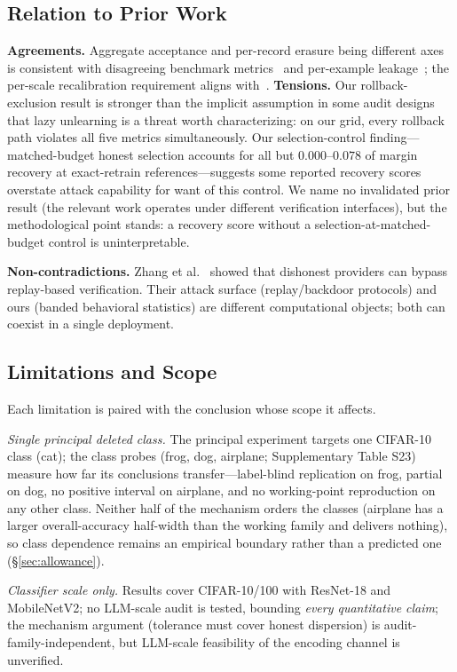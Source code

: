 \documentclass[lettersize,journal]{IEEEtran}
\begin{document}
\subsection{Relation to Prior Work}
\textbf{Agreements.} Aggregate acceptance and per-record
erasure being different axes is consistent with disagreeing
benchmark metrics~\cite{dorna2025openunlearning} and
per-example leakage~\cite{hayes2024inexact}; the per-scale
recalibration requirement aligns
with~\cite{goel2022adversarial}.
\textbf{Tensions.} Our rollback-exclusion result is stronger
than the implicit assumption in some audit designs that lazy
unlearning is a threat worth characterizing: on our grid,
every rollback path violates all five metrics simultaneously.
Our selection-control finding---matched-budget honest
selection accounts for all but $0.000$--$0.078$ of margin
recovery at exact-retrain references---suggests some reported
recovery scores overstate attack capability for want of this
control. We name no invalidated prior result (the relevant
work operates under different verification interfaces), but
the methodological point stands: a recovery score without a
selection-at-matched-budget control is uninterpretable.

\textbf{Non-contradictions.} Zhang et
al.~\cite{zhang2024fragile} showed that dishonest providers
can bypass replay-based verification. Their attack surface
(replay/backdoor protocols) and ours (banded behavioral
statistics) are different computational objects; both can
coexist in a single deployment.

\subsection{Limitations and Scope}\label{sec:limitations}
Each limitation is paired with the conclusion whose scope it
affects.

\emph{Single principal deleted class.} The principal
experiment targets one CIFAR-10 class (cat); the class
probes (frog, dog, airplane; Supplementary Table S23)
measure how far its conclusions transfer---label-blind
replication on frog, partial on dog, no positive interval
on airplane, and no working-point reproduction on any other
class. Neither half of the mechanism orders the classes
(airplane has a larger overall-accuracy half-width than the
working family and delivers nothing), so class dependence
remains an
empirical boundary rather than a predicted one
(\S\ref{sec:allowance}).

\emph{Classifier scale only.} Results cover CIFAR-10/100 with
ResNet-18 and MobileNetV2; no LLM-scale audit is tested,
bounding \emph{every quantitative claim}; the mechanism
argument (tolerance must cover honest dispersion) is
audit-family-independent, but LLM-scale feasibility of the
encoding channel is unverified.
\end{document}
